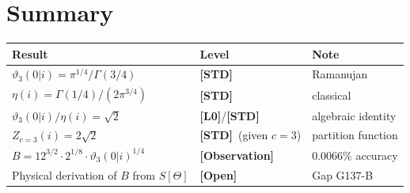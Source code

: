 \documentclass[12pt,a4paper]{article}
\theoremstyle{remark}
\newcommand{\OPEN}{\textbf{[Open]}}
\newcommand{\Lzero}{\textbf{[L0]}}
\newcommand{\STD}{\textbf{[STD]}}
\newcommand{\OBS}{\textbf{[Observation]}}
\begin{document}
\section{Summary}
\label{sec:summary}

\begin{tcolorbox}[colback=green!4!white, colframe=green!55!black,
  title={Results summary}]
\begin{center}
\begin{tabular}{lll}
\toprule
\textbf{Result} & \textbf{Level} & \textbf{Note} \\
\midrule
$\vartheta_3(0|i) = \pi^{1/4}/\Gamma(3/4)$ & \STD & Ramanujan \\
$\eta(i) = \Gamma(1/4)/(2\pi^{3/4})$ & \STD & classical \\
$\vartheta_3(0|i)/\eta(i) = \sqrt{2}$ & \Lzero/\STD & algebraic identity \\
$Z_{c=3}(i) = 2\sqrt{2}$ & \STD\ (given $c=3$) & partition function \\
$B = 12^{3/2}\cdot 2^{1/8}\cdot\vartheta_3(0|i)^{1/4}$ & \OBS & $0.0066\%$ accuracy \\
Physical derivation of $B$ from $S[\Theta]$ & \OPEN & Gap G137-B \\
\bottomrule
\end{tabular}
\end{center}
\end{tcolorbox}
\end{document}
